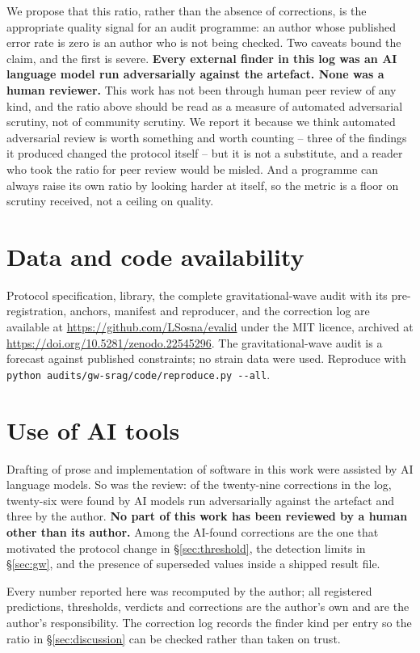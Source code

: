 \documentclass[11pt,a4paper]{article}
\begin{document}
We propose that this ratio, rather than the absence of corrections, is the
appropriate quality signal for an audit programme: an author whose published
error rate is zero is an author who is not being checked. Two caveats bound the
claim, and the first is severe. \textbf{Every external finder in this log was
an AI language model run adversarially against the artefact. None was a human
reviewer.} This work has not been through human peer review of any kind, and
the ratio above should be read as a measure of automated adversarial scrutiny,
not of community scrutiny. We report it because we think automated adversarial
review is worth something and worth counting -- three of the findings it
produced changed the protocol itself -- but it is not a substitute, and a
reader who took the ratio for peer review would be misled. And a programme can
always raise its own ratio by looking
harder at itself, so the metric is a floor on scrutiny received, not a ceiling
on quality.

\section*{Data and code availability}

Protocol specification, library, the complete gravitational-wave audit with its
pre-registration, anchors, manifest and reproducer, and the correction log are
available at \url{https://github.com/LSosna/evalid} under the MIT licence, archived at
\url{https://doi.org/10.5281/zenodo.22545296}. The gravitational-wave audit is a forecast against published
constraints; no strain data were used. Reproduce with
\texttt{python audits/gw-srag/code/reproduce.py -{}-all}.

\section*{Use of AI tools}

Drafting of prose and implementation of software in this work were assisted by
AI language models. So was the review: of the twenty-nine corrections in the
log, twenty-six were found by AI models run adversarially against the artefact
and three by the author. \textbf{No part of this work has been reviewed by a
human other than its author.} Among the AI-found corrections are the one that
motivated the protocol change in \S\ref{sec:threshold}, the detection limits
in \S\ref{sec:gw}, and the presence of superseded values inside a shipped
result file.

Every number reported here was recomputed by the author; all registered
predictions, thresholds, verdicts and corrections are the author's own and are
the author's responsibility. The correction log records the finder kind per
entry so the ratio in \S\ref{sec:discussion} can be checked rather than taken
on trust.
\end{document}

